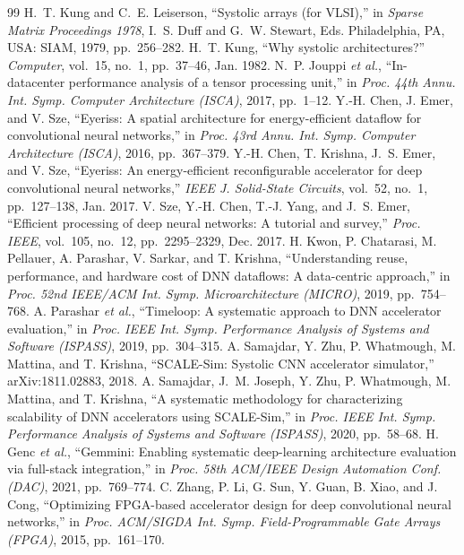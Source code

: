 \documentclass[conference]{IEEEtran}
\begin{document}
\begin{thebibliography}{99}
 H.~T. Kung and C.~E. Leiserson, ``Systolic arrays (for VLSI),'' in \emph{Sparse Matrix Proceedings 1978}, I.~S. Duff and G.~W. Stewart, Eds. Philadelphia, PA, USA: SIAM, 1979, pp.~256--282.
 H.~T. Kung, ``Why systolic architectures?'' \emph{Computer}, vol.~15, no.~1, pp.~37--46, Jan. 1982.
 N.~P. Jouppi \emph{et al.}, ``In-datacenter performance analysis of a tensor processing unit,'' in \emph{Proc. 44th Annu. Int. Symp. Computer Architecture (ISCA)}, 2017, pp.~1--12.
 Y.-H. Chen, J. Emer, and V. Sze, ``Eyeriss: A spatial architecture for energy-efficient dataflow for convolutional neural networks,'' in \emph{Proc. 43rd Annu. Int. Symp. Computer Architecture (ISCA)}, 2016, pp.~367--379.
 Y.-H. Chen, T. Krishna, J.~S. Emer, and V. Sze, ``Eyeriss: An energy-efficient reconfigurable accelerator for deep convolutional neural networks,'' \emph{IEEE J. Solid-State Circuits}, vol.~52, no.~1, pp.~127--138, Jan. 2017.
 V. Sze, Y.-H. Chen, T.-J. Yang, and J.~S. Emer, ``Efficient processing of deep neural networks: A tutorial and survey,'' \emph{Proc. IEEE}, vol.~105, no.~12, pp.~2295--2329, Dec. 2017.
 H. Kwon, P. Chatarasi, M. Pellauer, A. Parashar, V. Sarkar, and T. Krishna, ``Understanding reuse, performance, and hardware cost of DNN dataflows: A data-centric approach,'' in \emph{Proc. 52nd IEEE/ACM Int. Symp. Microarchitecture (MICRO)}, 2019, pp.~754--768.
 A. Parashar \emph{et al.}, ``Timeloop: A systematic approach to DNN accelerator evaluation,'' in \emph{Proc. IEEE Int. Symp. Performance Analysis of Systems and Software (ISPASS)}, 2019, pp.~304--315.
 A. Samajdar, Y. Zhu, P. Whatmough, M. Mattina, and T. Krishna, ``SCALE-Sim: Systolic CNN accelerator simulator,'' arXiv:1811.02883, 2018.
 A. Samajdar, J.~M. Joseph, Y. Zhu, P. Whatmough, M. Mattina, and T. Krishna, ``A systematic methodology for characterizing scalability of DNN accelerators using SCALE-Sim,'' in \emph{Proc. IEEE Int. Symp. Performance Analysis of Systems and Software (ISPASS)}, 2020, pp.~58--68.
 H. Genc \emph{et al.}, ``Gemmini: Enabling systematic deep-learning architecture evaluation via full-stack integration,'' in \emph{Proc. 58th ACM/IEEE Design Automation Conf. (DAC)}, 2021, pp.~769--774.
 C. Zhang, P. Li, G. Sun, Y. Guan, B. Xiao, and J. Cong, ``Optimizing FPGA-based accelerator design for deep convolutional neural networks,'' in \emph{Proc. ACM/SIGDA Int. Symp. Field-Programmable Gate Arrays (FPGA)}, 2015, pp.~161--170.

\end{thebibliography}
\end{document}

